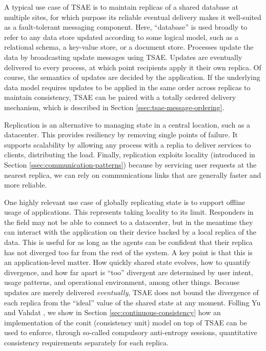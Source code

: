 \documentclass[]             %
{NASA}                       %
\theoremstyle{definition}
\begin{document}
A typical use case of TSAE is to maintain replicas of a shared
database at multiple sites, for which purpose its reliable eventual
delivery makes it well-suited as a fault-tolerant messaging
component. Here, ``database'' is used broadly to refer to any data
store updated according to some logical model, such as a relational
schema, a key-value store, or a document store. Processes update the
data by broadcasting update messages using TSAE. Updates are
eventually delivered to every process, at which point recipients apply
it their own replica. Of course, the semantics of updates are decided
by the application. If the underlying data model requires updates to
be applied in the same order across replicas to maintain consistency,
TSAE can be paired with a totally ordered delivery mechanism, which is
described in Section
\ref{ssec:tsae-message-ordering}. %


Replication is an alternative to managing state in a central location,
such as a datacenter. This provides resiliency by removing single
points of failure. It supports scalability by allowing any process
with a replia to deliver services to clients, distributing the
load. Finally, replication exploits locality (introduced in Section
\ref{ssec:communication-patterns}) because by servicing user requests
at the nearest replica, we can rely on communications links that are
generally faster and more reliable.

One highly relevant use case of globally replicating state is to
support offline usage of applications. This represents taking locality
to its limit. Responders in the field may not be able to connect to a
datacenter, but in the meantime they can interact with the application
on their device backed by a local replica of the data. This is useful
for as long as the agents can be confident that their replica has not
diverged too far from the rest of the system. A key point is that this
is an application-level matter. How quickly shared state evolves, how
to quantify divergence, and how far apart is ``too'' divergent are
determined by user intent, usage patterns, and operational
environment, among other things. Because updates are merely delivered
\emph{eventually}, TSAE does not bound the divergence of each replica
from the ``ideal'' value of the shared state at any moment. Folling Yu
and Vahdat \cite{2002tact}, we show in Section
\ref{sec:continuous-consistency} how an implementation of the conit
(consistency unit) model on top of TSAE can be used to enforce,
through so-called compulsory anti-entropy sessions, quantitative
consistency requirements separately for each replica.
\end{document}
